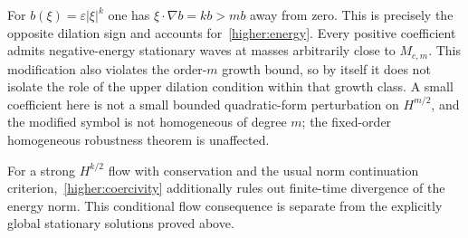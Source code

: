 \begin{remark}
For $b(\xi)=\varepsilon|\xi|^k$ one has
$\xi\cdot\nabla b=kb>mb$ away from zero. This is precisely the
opposite dilation sign and accounts for~\eqref{higher:energy}.
Every positive coefficient admits negative-energy stationary waves
at masses arbitrarily close to $M_{c,m}$. This modification also violates
the order-$m$ growth bound, so by itself it does not isolate the role of
the upper dilation condition within that growth class. A small
coefficient here is not a small bounded quadratic-form perturbation on
$H^{m/2}$, and the modified symbol is not homogeneous of degree $m$;
the fixed-order homogeneous robustness theorem is unaffected.

For a strong $H^{k/2}$ flow with conservation and the usual norm
continuation criterion,~\eqref{higher:coercivity} additionally rules
out finite-time divergence of the energy norm. This conditional
flow consequence is separate from the explicitly global stationary
solutions proved above.
\end{remark}

